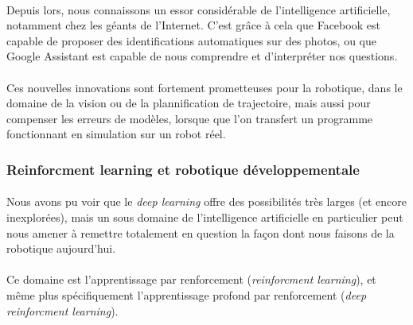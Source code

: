 \documentclass[a4paper,10pt]{article}
\begin{document}
                \paragraph{}
                    Depuis lors, nous connaissons un essor considérable de l'intelligence 
                    artificielle, notamment chez les géants de l'Internet. C'est grâce à cela 
                    que Facebook est capable de proposer des identifications automatiques sur
                    des photos, ou que Google Assistant est capable de nous comprendre et 
                    d'interpréter nos questions.
                    
                \paragraph{}
                    Ces nouvelles innovations sont fortement prometteuses pour la robotique, 
                    dans le domaine de la vision ou de la plannification de trajectoire, 
                    mais aussi pour compenser les erreurs de modèles, lorsque que l'on transfert 
                    un programme fonctionnant en simulation sur un robot réel. 
            
            \subsubsection{Reinforcment learning et robotique développementale}
            
                \paragraph{}
                    Nous avons pu voir que le \textit{deep learning} offre des possibilités 
                    très larges (et encore inexplorées), mais un sous domaine de l'intelligence 
                    artificielle en particulier peut nous amener à remettre totalement 
                    en question la façon dont nous faisons de la robotique aujourd'hui. 
                    
                \paragraph{}
                    Ce domaine est l'apprentissage par renforcement (\textit{reinforcment learning}), 
                    et même plus spécifiquement l'apprentissage profond par renforcement (\textit{deep 
                    reinforcment learning}). 
                    
\end{document}
